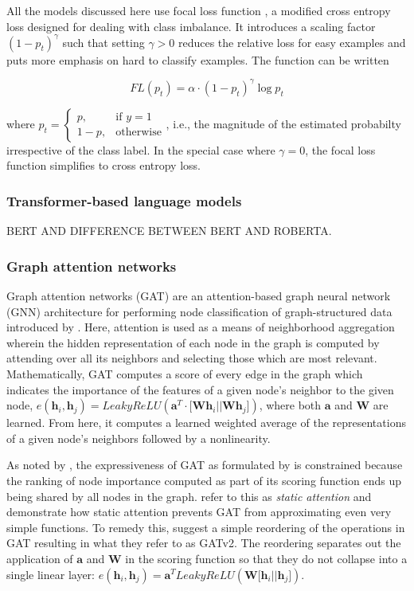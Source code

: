 \documentclass[letterpaper]{article} %
\begin{document}
All the models discussed here use  focal loss function \citep{lin2017focal}, a modified cross entropy loss designed for dealing with class imbalance. It introduces a scaling factor $(1-p_t)^\gamma$ such that setting $\gamma > 0$ reduces the relative loss for easy examples and puts more emphasis on hard to classify examples. The function can be written

$$
FL(p_t) = \alpha \cdot (1 - p_t)^\gamma \log{p_t}
$$

where $p_t = \begin{cases} p, & \text{if } y =1 \\ 1-p, & \text{otherwise}  \end{cases}$, i.e., the magnitude of the estimated probabilty irrespective of the class label. In the special case where $\gamma=0$, the focal loss function simplifies to cross entropy loss.

\subsubsection{Transformer-based language models}

BERT AND DIFFERENCE BETWEEN BERT AND ROBERTA.

\subsubsection{Graph attention networks}

Graph attention networks (GAT) are an attention-based graph neural network (GNN) architecture for performing node classification of graph-structured data introduced by \citet{Vel2017}. Here, attention is used as a means of neighborhood aggregation wherein the hidden representation of each node in the graph is computed by attending over all its neighbors and selecting those which are most relevant.  Mathematically, GAT computes a score of every edge in the graph which indicates the importance of the features of a given node's neighbor to the given node, $e(\mathbf{h}_i, \mathbf{h}_j)=LeakyReLU(\bm{a}^T \cdot \lbrack \mathbf{Wh}_i || \mathbf{Wh}_j \rbrack)$, where both $\bm{a}$ and $\mathbf{W}$ are learned. From here, it computes a learned weighted average of the representations of a given node's neighbors followed by a nonlinearity. 

As noted by \citet{Brody2021}, the expressiveness of GAT as formulated by \citet{Vel2017} is constrained because the ranking of node importance computed as part of its scoring function ends up being shared by all nodes in the graph. \citet{Brody2021} refer to this as \textit{static attention} and demonstrate how static attention prevents GAT from approximating even very simple functions. To remedy this, \citet{Brody2021} suggest a simple reordering of the operations in GAT resulting in what they refer to as GATv2. The reordering separates out the application of $\bm{a}$ and $\mathbf{W}$ in the scoring function so that they do not collapse into a single linear layer: $e(\mathbf{h}_i, \mathbf{h}_j)=\bm{a}^T LeakyReLU(\mathbf{W} \lbrack \mathbf{h}_i || \mathbf{h}_j \rbrack)$. 
\end{document}
